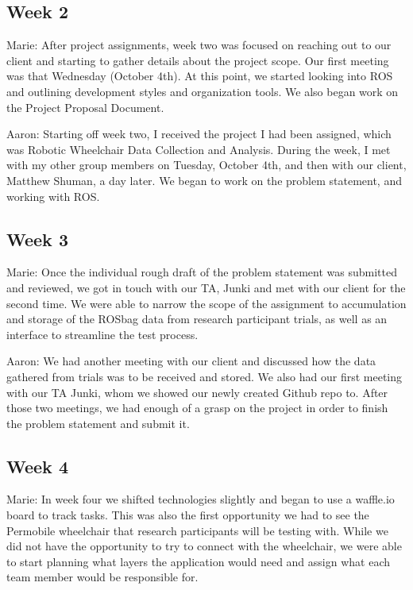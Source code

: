 \documentclass[onecolumn, draftclsnofoot,10pt, compsoc]{IEEEtran}
\begin{document}
\subsection{Week 2}
Marie: After project assignments, week two was focused on reaching out to our client and starting to gather details about the project scope. Our first meeting was that Wednesday (October 4th). At this point, we started looking into ROS and outlining development styles and organization tools. We also began work on the Project Proposal Document.\par

Aaron: Starting off week two, I received the project I had been assigned, which was Robotic Wheelchair Data Collection and Analysis. During the week, I met with my other group members on Tuesday, October 4th, and then with our client, Matthew Shuman, a day later. We began to work on the problem statement, and working with ROS.\par

\subsection{Week 3}
Marie: Once the individual rough draft of the problem statement was submitted and reviewed, we got in touch with our TA, Junki and met with our client for the second time. We were able to narrow the scope of the assignment to accumulation and storage of the ROSbag data from research participant trials, as well as an interface to streamline the test process.\par

Aaron: We had another meeting with our client and discussed how the data gathered from trials was to be received and stored. We also had our first meeting with our TA Junki, whom we showed our newly created Github repo to. After those two meetings, we had enough of a grasp on the project in order to finish the problem statement and submit it.\par

\subsection{Week 4}
Marie: In week four we shifted technologies slightly and began to use a waffle.io board to track tasks. This was also the first opportunity we had to see the Permobile wheelchair that research participants will be testing with. While we did not have the opportunity to try to connect with the wheelchair, we were able to start planning what layers the application would need and assign what each team member would be responsible for.\par
\end{document}
